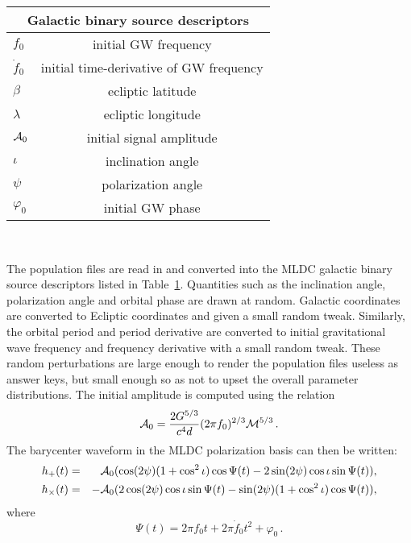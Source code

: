 \documentclass[12pt]{article}
\begin{document}
\begin{center}
\begin{table}\label{galactic}
\begin{tabular}{l|c}
\hline
\hline
\multicolumn{2}{c}{{\bf Galactic binary source descriptors}} \\
\hline
\hline
$f_0$    & initial GW frequency\\ 
$\dot{f}_0$ & initial time-derivative of GW frequency\\
$\beta$ & ecliptic latitude \\
$\lambda$ & ecliptic longitude\\
${\cal A}_0$ & initial signal amplitude\\
$\iota$ & inclination angle\\
$\psi$ & polarization angle\\
$\varphi_0$ &  initial GW phase\\
\hline \hline
\end{tabular} \\
\end{table}
\end{center}

The population files are read in and converted into the MLDC galactic
binary source descriptors listed in Table~\ref{galactic}. Quantities
such as the inclination angle, polarization angle and orbital phase
are drawn at random. Galactic coordinates are converted to Ecliptic
coordinates and given a small random tweak. Similarly, the orbital period
and period derivative are converted to initial gravitational wave frequency
and frequency derivative with a small random tweak. These random
perturbations are large enough to render the population files useless
as answer keys, but small enough so as not to upset the overall
parameter distributions. The initial amplitude is computed using
the relation
\begin{equation}\label{amp}
{\cal A}_0 = \frac{2G^{5/3}}{c^4 d}(2\pi f_0)^{2/3} {\cal M}^{5/3} \, .
\end{equation}
The barycenter waveform in the MLDC polarization basis can then be written:
\begin{eqnarray}\label{bary_galactic}
h_+(t) &=& {\cal A}_0( \cos(2\psi)(1 + \cos^2{\iota})\cos\Psi(t) - 2\sin(2 \psi)\cos\iota \sin\Psi(t) ), \\
h_\times(t) &=& -{\cal A}_0(2 \cos (2\psi)\cos\iota \sin\Psi(t)  - \sin (2 \psi)(1 + \cos^2{\iota})\cos\Psi(t)),
\end{eqnarray}
where
\begin{equation}
\Psi(t) = 2\pi f_0 t + 2\pi \dot{f}_0 t^2 + \varphi_0 \, .
\end{equation}
\end{document}
